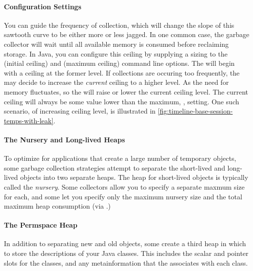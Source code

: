 \paragraph{Configuration Settings}
You can guide the frequency of collection, which will change the slope of this
sawtooth curve to be either more or less jagged. In one common case, the garbage
collector will wait until all available memory is consumed before reclaiming
storage.  In Java, you can configure this ceiling by supplying a sizing to the
 (initial ceiling) and
 (maximum ceiling) command line options. 
 The \jre will begin with a ceiling at the
former level. If collections are occuring too frequently, the \jre may decide to
increase the \emph{current} ceiling to a higher level. As the need for memory
fluctuates, so the \jre will raise or lower the current ceiling level. The
current ceiling will always be some value lower than the maximum, ,
setting. One such scenario, of increasing ceiling level, is illustrated in
\autoref{fig:timeline-base-session-temps-with-leak}.

\paragraph{The Nursery and Long-lived Heaps}
To optimize for applications that create a large number of temporary objects, 
some garbage collection strategies attempt to separate the short-lived and
long-lived objects into two separate heaps. The heap for short-lived objects is
typically called the \emph{nursery}. Some collectors allow you to specify a
separate maxmum size for each, and some let you specify only the
maximum nursery size and the total maximum heap consumption (via .)


\paragraph{The Permspace Heap}
In addition to separating new and old objects, some \jres create
a third heap in which to store the descriptions of your Java classes. This
includes the scalar and pointer slots for the classes, and any metainformation
that the \jre associates with each class.


